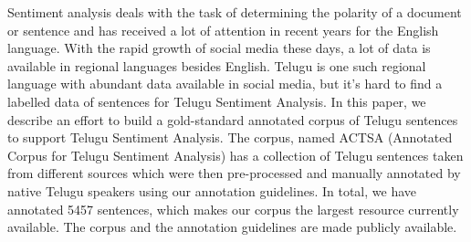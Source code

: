 Sentiment analysis deals with the task of determining the polarity of a document or sentence and has received a lot of attention in recent years for the English language. With the rapid growth of social media these days, a lot of data is available in regional languages besides English. Telugu is one such regional language with abundant data available in social media, but it's hard to find a labelled data of sentences for Telugu Sentiment Analysis. In this paper, we describe an effort to build a gold-standard annotated corpus of Telugu sentences to support Telugu Sentiment Analysis. The corpus, named ACTSA (Annotated Corpus for Telugu Sentiment Analysis) has a collection of Telugu sentences taken from different sources which were then pre-processed and manually annotated by native Telugu speakers using our annotation guidelines. In total, we have annotated 5457 sentences, which makes our corpus the largest resource currently available. The corpus and the annotation guidelines are made publicly available.
